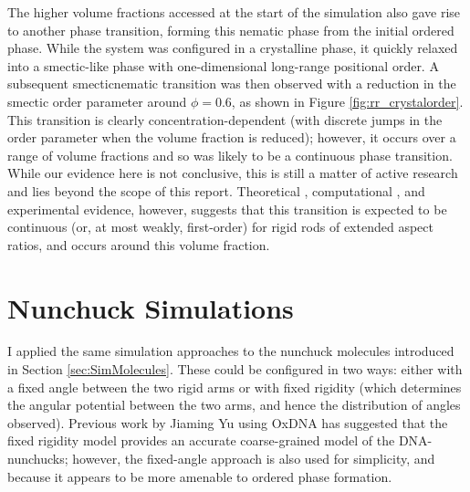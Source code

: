 \documentclass[11pt, a4paper]{article} %
\begin{document}
The higher volume fractions accessed at the start of the simulation also gave rise to another phase transition, forming this nematic phase from the initial ordered phase. While the system was configured in a crystalline phase, it quickly relaxed into a smectic-like phase with one-dimensional long-range positional order. A subsequent smectic\textendash nematic transition was then observed with a reduction in the smectic order parameter around $\phi  = 0.6$, as shown in Figure \ref{fig:rr_crystalorder}. This transition is clearly concentration-dependent (with discrete jumps in the order parameter when the volume fraction is reduced); however, it occurs over a range of volume fractions and so was likely to be a continuous phase transition. While our evidence here is not conclusive, this is still a matter of active research and lies beyond the scope of this report. Theoretical \cite{Wen1987}, computational \cite{Frenkel1988, McGrother1996}, and experimental \cite{Dogic1997, Doane1972} evidence, however, suggests that this transition is expected to be continuous (or, at most weakly, first-order) for rigid rods of extended aspect ratios, and occurs around this volume fraction. 

\section{Nunchuck Simulations} \label{sec:Nunchuck_Sim}
I applied the same simulation approaches to the nunchuck molecules introduced in Section \ref{sec:SimMolecules}. These could be configured in two ways: either with a fixed angle between the two rigid arms or with fixed rigidity (which determines the angular potential between the two arms, and hence the distribution of angles observed). Previous work by Jiaming Yu using OxDNA \cite{OxDNA} has suggested that the fixed rigidity model provides an accurate coarse-grained model of the DNA-nunchucks; however, the fixed-angle approach is also used for simplicity, and because it appears to be more amenable to ordered phase formation.


\end{document}
